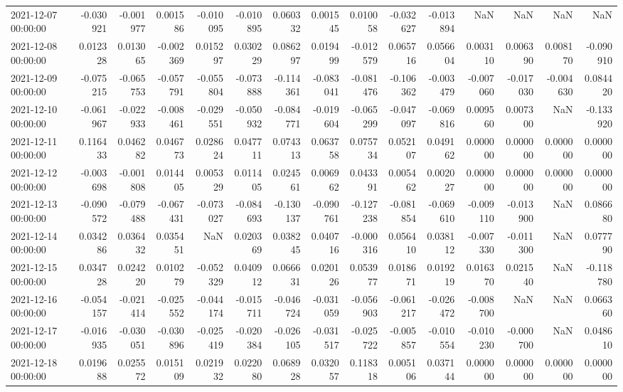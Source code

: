 \begin{tabular}{lrrrrrrrrrrrrrr}
2021-12-07 00:00:00 & -0.030921 & -0.001977 & 0.001586 & -0.010095 & -0.010895 & 0.060332 & 0.001545 & 0.010058 & -0.032627 & -0.013894 & NaN & NaN & NaN & NaN \\
2021-12-08 00:00:00 & 0.012328 & 0.013065 & -0.002369 & 0.015297 & 0.030229 & 0.086297 & 0.019499 & -0.012579 & 0.065716 & 0.056604 & 0.003110 & 0.006390 & 0.008170 & -0.090910 \\
2021-12-09 00:00:00 & -0.075215 & -0.065753 & -0.057791 & -0.055804 & -0.073888 & -0.114361 & -0.083041 & -0.081476 & -0.106362 & -0.003479 & -0.007060 & -0.017030 & -0.004630 & 0.084420 \\
2021-12-10 00:00:00 & -0.061967 & -0.022933 & -0.008461 & -0.029551 & -0.050932 & -0.084771 & -0.019604 & -0.065299 & -0.047097 & -0.069816 & 0.009560 & 0.007300 & NaN & -0.133920 \\
2021-12-11 00:00:00 & 0.116433 & 0.046282 & 0.046773 & 0.028624 & 0.047711 & 0.074313 & 0.063758 & 0.075734 & 0.052107 & 0.049162 & 0.000000 & 0.000000 & 0.000000 & 0.000000 \\
2021-12-12 00:00:00 & -0.003698 & -0.001808 & 0.014405 & 0.005329 & 0.011405 & 0.024561 & 0.006962 & 0.043391 & 0.005462 & 0.002027 & 0.000000 & 0.000000 & 0.000000 & 0.000000 \\
2021-12-13 00:00:00 & -0.090572 & -0.079488 & -0.067431 & -0.073027 & -0.084693 & -0.130137 & -0.090761 & -0.127238 & -0.081854 & -0.069610 & -0.009110 & -0.013900 & NaN & 0.086680 \\
2021-12-14 00:00:00 & 0.034286 & 0.036432 & 0.035451 & NaN & 0.020369 & 0.038245 & 0.040716 & -0.000316 & 0.056410 & 0.038112 & -0.007330 & -0.011300 & NaN & 0.077790 \\
2021-12-15 00:00:00 & 0.034728 & 0.024220 & 0.010279 & -0.052329 & 0.040912 & 0.066631 & 0.020126 & 0.053977 & 0.018671 & 0.019219 & 0.016370 & 0.021540 & NaN & -0.118780 \\
2021-12-16 00:00:00 & -0.054157 & -0.021414 & -0.025552 & -0.044174 & -0.015711 & -0.046724 & -0.031059 & -0.056903 & -0.061217 & -0.026472 & -0.008700 & NaN & NaN & 0.066360 \\
2021-12-17 00:00:00 & -0.016935 & -0.030051 & -0.030896 & -0.025419 & -0.020384 & -0.026105 & -0.031517 & -0.025722 & -0.005857 & -0.010554 & -0.010230 & -0.000700 & NaN & 0.048610 \\
2021-12-18 00:00:00 & 0.019688 & 0.025572 & 0.015109 & 0.021932 & 0.022080 & 0.068928 & 0.032057 & 0.118318 & 0.005106 & 0.037144 & 0.000000 & 0.000000 & 0.000000 & 0.000000 \\

\end{tabular}
